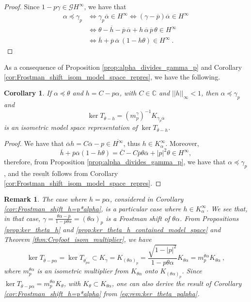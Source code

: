 \documentclass{article}
\numberwithin{equation}{section}
\theoremstyle{plain}
\newtheorem{cor}[thm]{Corollary}
\newtheorem{rem}[thm]{Remark}
\newcommand{\Hinf}{\ensuremath{H^\infty}}
\newcommand{\CC}{\ensuremath{\mathbb{C}}}
\newcommand{\GG}{\ensuremath{\mathcal{G}}}
\newcommand{\ol}[1]{\ensuremath{\overline{#1}}}
\begin{document}
\begin{proof}
Since $1-p\gamma \in\GG\Hinf$, we have that
\begin{align}
\alpha \preceq \gamma_p
	& \iff 
	\gamma_p \ol\alpha \in\Hinf	 \iff (\gamma - \ol p) \ol\alpha \in\Hinf\\
& \iff 
	\theta - \ol h - \ol p\, \ol\alpha + h\,\ol\alpha\, \ol p\, \theta \in\Hinf \\
& \iff 
	\ol h + \ol p\, \ol\alpha \, (1 - h\theta) \in \Hinf \ .
\end{align}
\end{proof}


As a consequence of Proposition \ref{prop:alpha_divides_gamma_p} and Corollary \ref{cor:Frostman_shift_isom_model_space_repres}, we have the following.


\begin{cor}
\label{cor:constant_h+palpha}
If $\alpha \preceq \theta$ and $h = C - p\alpha$, with $C\in\CC$ and $||h||_\infty < 1$, then $\alpha \preceq \gamma_p$ and
\begin{equation}
\ker T_{\ol\theta -h} = (m_p^\gamma)^{-1} K_{\gamma_p \ol\alpha}
\end{equation}
is an isometric model space representation of $\ker T_{\ol\theta -h}$.
\end{cor}


\begin{proof}
We have that $\ol\alpha h = C \ol\alpha - p \in\ol\Hinf$, thus $h\in K_\alpha^\infty$.
Moreover,
\begin{equation}
\ol h + \ol p \ol\alpha (1-h\theta) = \ol C - C \ol p \theta \ol\alpha + |p|^2 \theta \in\Hinf,
\end{equation}
therefore, from Proposition \ref{prop:alpha_divides_gamma_p}, we have that $\alpha \preceq \gamma_p$, and the result follows from Corollary \ref{cor:Frostman_shift_isom_model_space_repres}.
\end{proof}


\begin{rem}
\label{rem:ker_theta_palpha}
The case where $h=p\alpha$, considered in Corollary \ref{cor:Frostman_shift_h=p*alpha}, is a particular case where $h\in K_\alpha^\infty$.
We see that, in that case, $\gamma = \frac{\theta \alpha - \ol p}{1 - p \theta \alpha} = (\theta\alpha)_p$ is a Frostman shift of $\theta\alpha$.
From Propositions \ref{prop:ker_theta_h} and \ref{prop:ker_theta_h_contained_model_space} and Theorem \ref{thm:Crofoot_isom_multiplier}, we have
\begin{equation}
\label{eq:rem:ker_theta_palpha}
\ker T_{\ol\theta - p\alpha} = \ker T_{\ol{\theta_{p\alpha}}} \subset 
K_\gamma = K_{(\theta\alpha)_p} = \frac{\sqrt{1-|p|^2}}{1-p\theta\alpha} K_{\theta\alpha} = m_p^{\theta\alpha} K_{\theta\alpha}\ ,
\end{equation}
where $m_p^{\theta\alpha}$ is an isometric multiplier from $K_{\theta\alpha}$ onto $K_{(\theta\alpha)_p}$.
Since $\ker T_{\ol\theta - p\alpha} = m_p^{\theta\alpha} K_\theta$, with $K_\theta \subset K_{\theta\alpha}$, one can also derive the result of Corollary \ref{cor:Frostman_shift_h=p*alpha} from \eqref{eq:rem:ker_theta_palpha}.
\end{rem}
\end{document}
